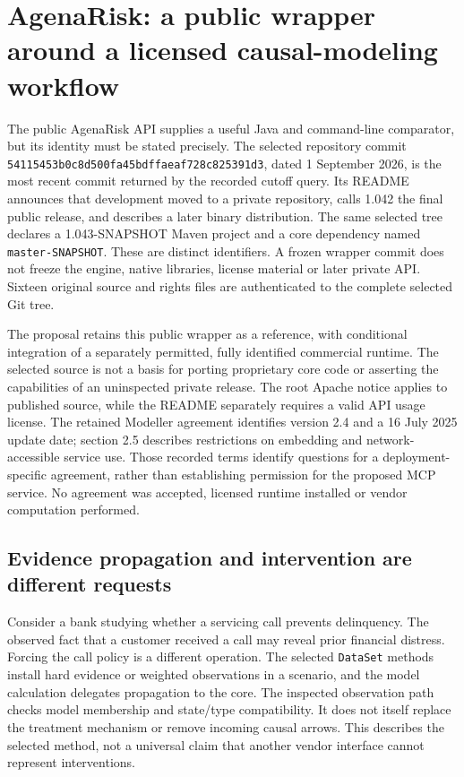 \section{AgenaRisk: a public wrapper around a licensed causal-modeling workflow}
\label{sec:exec25-agena-reuse}
The public AgenaRisk API supplies a useful Java and command-line comparator,
but its identity must be stated precisely. The selected repository commit
\texttt{54115453b0c8d500fa45}\allowbreak\texttt{bdffaeaf728c825391d3},
dated 1 September 2026, is the most recent commit returned by the recorded
cutoff query. Its README announces that development moved to a private
repository, calls 1.042 the final public release, and describes a later binary
distribution. The same selected tree declares a 1.043-SNAPSHOT Maven project
and a core dependency named \texttt{master-SNAPSHOT}. These are distinct
identifiers. A frozen wrapper commit does not freeze the engine, native
libraries, license material or later private API. Sixteen original source
and rights files are authenticated to the complete selected Git tree.
\citep{exec25_agena_source}

The proposal retains this public wrapper as a reference, with conditional
integration of a separately permitted, fully identified commercial runtime.
The selected source is not a basis for porting proprietary core code or
asserting the capabilities of an uninspected private release. The root
Apache notice applies to published source, while the README separately
requires a valid API usage license. The retained Modeller agreement identifies
version 2.4 and a 16 July 2025 update date; section 2.5 describes restrictions
on embedding and network-accessible service use. Those recorded terms identify
questions for a deployment-specific agreement, rather than establishing
permission for the proposed MCP service. No agreement was accepted, licensed
runtime installed or vendor computation performed.~\citep{exec25_agena_source,exec25_agena_choice}

\subsection{Evidence propagation and intervention are different requests}
Consider a bank studying whether a servicing call prevents delinquency. The
observed fact that a customer received a call may reveal prior financial
distress. Forcing the call policy is a different operation. The selected
\texttt{DataSet} methods install hard evidence or weighted observations in a
scenario, and the model calculation delegates propagation to the core. The
inspected observation path checks model membership and state/type compatibility.
It does not itself replace the treatment mechanism or remove incoming causal
arrows. This describes the selected method, not a universal claim that another
vendor interface cannot represent interventions.~\citep{exec25_agena_source}

